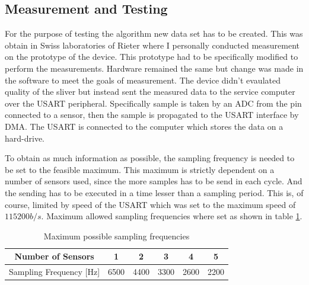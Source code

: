 \documentclass[twoside]{ctuthesis}
\theoremstyle{plain}
\theoremstyle{definition}
\theoremstyle{note}
\begin{document}
\subsection{Measurement and Testing}
\label{sec:MeasurmentAndTesting}
For the purpose of testing the algorithm new data set has to be created. This was obtain in Swiss laboratories of Rieter where I personally conducted measurement on the prototype of the device. This prototype had to be specifically modified to perform the measurements. Hardware remained the same but change was made in the software to meet the goals of measurement. The device didn't evaulated quality of the sliver but instead sent the measured data to the service computer over the USART peripheral. Specifically sample is taken by an ADC from the pin connected to a sensor, then the sample is propagated to the USART interface by DMA. The USART is connected to the computer which stores the data on a hard-drive.

To obtain as much information as possible, the sampling frequency is needed to be set to the feasible maximum. This maximum is strictly dependent on a number of sensors used, since the more samples has to be send in each cycle. And the sending has to be executed in a time lesser than a sampling period. This is, of course, limited by speed of the USART which was set to the maximum speed of $115200 b/s$. Maximum allowed sampling frequencies where set as shown in table \ref{tab:possibleFs}.
\begin{table}[htbp]
	\centering
	\caption{Maximum possible sampling frequencies}
	\begin{tabular}{cccccc}
		\toprule
		Number of Sensors	 & 1 & 2 & 3 & 4 & 5 \\
		\midrule
		Sampling Frequency [Hz]  & 6500  & 4400   & 3300 & 2600   & 2200  \\
		
		\bottomrule
	\end{tabular}%
	\label{tab:possibleFs}%
\end{table}%
\end{document}
